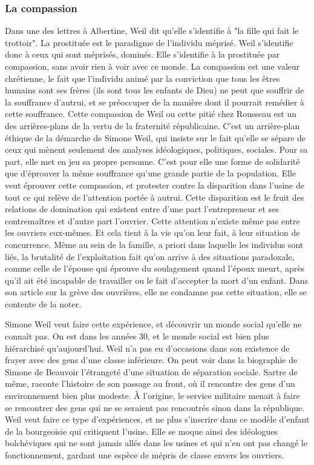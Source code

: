 \documentclass[a4paper,12pt]{book}
\begin{document}
\subsubsection{La compassion}
Dans une des lettres à Albertine, Weil dit qu'elle s'identifie à "la fille qui fait le trottoir". La prostituée est le paradigme de l'individu méprisé. Weil s'identifie donc à ceux qui sont méprisés, dominés. Elle s'identifie à la prostituée par compassion, sans avoir rien à voir avec ce monde. La compassion est une valeur chrétienne, le fait que l'individu animé par la conviction que tous les êtres humains sont ses frères (ils sont tous les enfants de Dieu) ne peut que souffrir de la souffrance d'autrui, et se préoccuper de la manière dont il pourrait remédier à cette souffrance. Cette compassion de Weil ou cette pitié chez Rousseau est un des arrières-plans de la vertu de la fraternité républicaine. C'est un arrière-plan éthique de la démarche de Simone Weil, qui insiste sur le fait qu'elle se sépare de ceux qui mènent seulement des analyses idéologiques, politiques, sociales. Pour sa part, elle met en jeu sa propre personne. C'est pour elle une forme de solidarité que d'éprouver la même souffrance qu'une grande partie de la population. Elle veut éprouver cette compassion, et protester contre la disparition dans l'usine de tout ce qui relève de l'attention portée à autrui. Cette disparition est le fruit des relations de domination qui existent entre d'une part l'entrepreneur et ses contremaîtres et d'autre part l'ouvrier. Cette attention n'existe même pas entre les ouvriers eux-mêmes. Et cela tient à la vie qu'on leur fait, à leur situation de concurrence. Même au sein de la famille, a priori dans laquelle les individus sont liés, la brutalité de l'exploitation fait qu'on arrive à des situations paradoxale, comme celle de l'épouse qui éprouve du soulagement quand l'époux meurt, après qu'il ait été incapable de travailler ou le fait d'accepter la mort d'un enfant. Dans son article sur la grève des ouvrières, elle ne condamne pas cette situation, elle se contente de la noter.
\par Simone Weil veut faire cette expérience, et découvrir un monde social qu'elle ne connaît pas. On est dans les années 30, et le monde social est bien plus hiérarchisé qu'aujourd'hui. Weil n'a pas eu d'occasions dans son existence de frayer avec des gens d'une classe inférieure. On peut voir dans la biographie de Simone de Beauvoir l'étrangeté d'une situation de séparation sociale. Sartre de même, raconte l'histoire de son passage au front, où il rencontre des gens d'un environnement bien plus modeste. À l'origine, le service militaire menait à faire se rencontrer des gens qui ne se seraient pas rencontrés sinon dans la république. Weil veut faire ce type d'expériences, et ne plus s'inscrire dans ce modèle d'enfant de la bourgeoisie qui critiquent l'usine. Elle se moque ainsi des idéologues bolchéviques qui ne sont jamais allés dans les usines et qui n'en ont pas changé le fonctionnement, gardant une espèce de mépris de classe envers les ouvriers.
\end{document}

